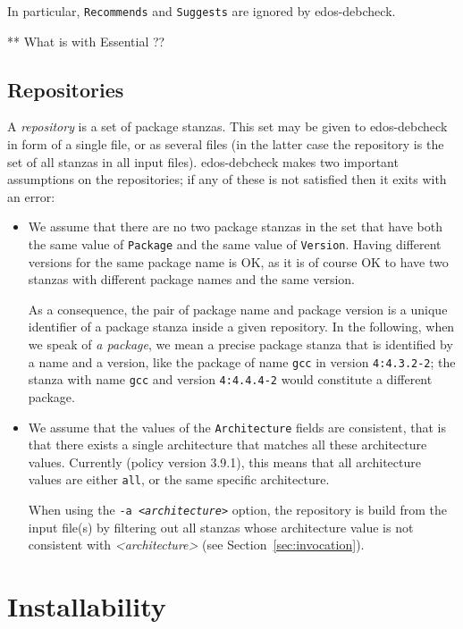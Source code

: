 \documentclass{article}
\newcommand{\debcheck}{edos-debcheck}
\begin{document}
In particular, \texttt{Recommends} and \texttt{Suggests} are ignored
by \debcheck.

** What is with Essential ??

\subsection{Repositories}
A \emph{repository} is a set of package stanzas. This set may be given
to \debcheck{} in form of a single file, or as several files (in the
latter case the repository is the set of all stanzas in all input
files). \debcheck{} makes two important assumptions on the
repositories; if any of these is not satisfied then it exits with an
error:

\begin{itemize}
\item
  We assume that there are no two package stanzas in the set that have
  both the same value of \texttt{Package} and the same value of
  \texttt{Version}. Having different versions for the same package
  name is OK, as it is of course OK to have two stanzas with different
  package names and the same version.

  As a consequence, the pair of package name and package version is a
  unique identifier of a package stanza inside a given repository. In
  the following, when we speak of \emph{a package}, we mean a precise
  package stanza that is identified by a name and a version, like the
  package of name \texttt{gcc} in version \texttt{4:4.3.2-2}; the
  stanza with name \texttt{gcc} and version \texttt{4:4.4.4-2} would
  constitute a different package.
\item
  We assume that the values of the \texttt{Architecture} fields are
  consistent, that is that there exists a single architecture that
  matches all these architecture values. Currently (policy version
  3.9.1), this means that all architecture values are either
  \texttt{all}, or the same specific architecture.

  When using the \texttt{-a \textit{<architecture>}} option, the
  repository is build from the input file(s) by filtering out all
  stanzas whose architecture value is not consistent with
  \textit{<architecture>} (see Section~\ref{sec:invocation}).
\end{itemize}

\section{Installability}
\label{sec:installability}
\end{document}
